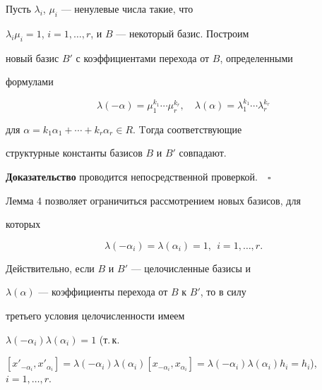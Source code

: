 \begin{lem}


Пусть $\lambda_i$, $\mu_i$ --- ненулевые числа такие, что


$\lambda_i\mu_i=1$, $i=1,\dotsc,r$, и $B$ --- некоторый базис. Построим


новый базис $B'$ с коэффициентами перехода от $B$, определенными


формулами


\begin{equation}


\lambda(-\alpha)=\mu_1^{k_1}\dotsb\mu_r^{k_r}, \quad


\lambda(\alpha)=\lambda_1^{k_1}\dotsb\lambda_r^{k_r}


\end{equation}


для $\alpha=k_1\alpha_1+\dotsb+k_r\alpha_r\in R$. Tогда соответствующие


структурные константы базисов $B$ и $B'$ совпадают.


\end{lem}





{\bf Доказательство} проводится непосредственной проверкой.$\quad\square$


\medskip





Лемма 4 позволяет ограничиться рассмотрением новых базисов, для


которых


\begin{equation}


\lambda(-\alpha_i)=\lambda(\alpha_i)=1,\ \ i=1,\dotsc,r.


\end{equation}


Действительно, если $B$ и $B'$ --- целочисленные базисы и


$\lambda(\alpha)$ --- коэффициенты перехода от $B$ к $B'$, то в силу


третьего условия целочисленности имеем


$\lambda(-\alpha_i)\lambda(\alpha_i)=1$ (т.\,к.


$[x'_{-\alpha_i},x'_{\alpha_i}]=\lambda(-\alpha_i)\lambda(\alpha_i)


[x_{-\alpha_i},x_{\alpha_i}]=\lambda(-\alpha_i)\lambda(\alpha_i)h_i=


h_i$), $i=1,\dotsc,r$.


